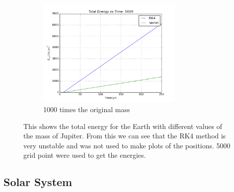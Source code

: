\documentclass[11pt,a4wide]{article}
\begin{document}
\begin{figure}[H]
\begin{subfigure}[b]{0.5\linewidth}
    \centering
    \includegraphics[width=70mm]{EJ_EnergyE3.png}
    \caption{1000 times the original mass} 
    \label{fig7:c} 
    \vspace{4ex}
\end{subfigure}%
\caption{This shows the total energy for the Earth with different values of the mass of Jupiter. From this we can see that the RK4 method is very unstable and was not used to make plots of the positions. 5000 grid point were used to get the energies.}
\end{figure}





\subsection{Solar System}
\end{document}
